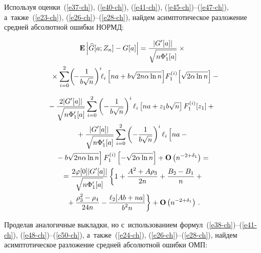 \begin{multicols}{2}
 Используя оценки~(\ref{e37-ch}), (\ref{e40-ch}), (\ref{e41-ch}), 
 (\ref{e45-ch})--(\ref{e47-ch}), а~также~(\ref{e23-ch}), (\ref{e26-ch})--(\ref{e28-ch}),
 найдем асимптотическое разложение средней абсолютной ошибки НОРМД:
 
 \noindent
 \begin{multline*}
 \mathbf{E}\left|\widehat{G}[a;Z_n]-G[a]\right|=\fr{|G'[a]|}
 {\sqrt {n\Phi'_1[a]}}\times{}\\
 {}\times \sum\limits_{i=0}^2\!  
 \left(\!-\fr{1}{b\sqrt{n}}\right)^i\!\! 
 \ell_i\left[na+b\sqrt{2n\alpha\ln n}\right]\! F_1^{(i)}\!\left[\sqrt{2\alpha\ln n}\right]-{}\hspace*{-6.48pt}
 \end{multline*}
 
 \noindent
 \begin{multline}
 \hspace*{-4.159pt}{} -\fr{2|G'[a]|}{\sqrt {n\Phi'_1[a]}}\sum\limits_{i=0}^2 
\left(-\fr{1}{b\sqrt{n}}\right)^i
 \ell_i\left[na+z_{1} b\sqrt{n}\right] F_1^{(i)}[z_{1}]+{}
\\
 {}+\fr{\left\vert G'[a]\right\vert }{\sqrt {n\Phi'_1[a]}}\sum\limits_{i=0}^2  
 \left(-\fr{1}{b\sqrt{n}}\right)^i
 \ell_i\left[
 \vphantom{\sqrt{2n\alpha\ln n}}
 na-{}\right.\\
\left. {}-b\sqrt{2n\alpha\ln n}\right] F_1^{(i)}\left[-\sqrt{2\alpha\ln n}\right]
 +\mathbf{O}\left(n^{-2+\delta_1}\right)={}
\\
 {}=\fr{2\varphi[0]|G'[a]|}{\sqrt{n\Phi'_1[a]}}
 \left\{1+\fr{A^2+A\rho_3}{2n} +\fr{B_2-B_1}{n}+{}\right.\\
\left. {}+\fr{\rho_3^2-\rho_4}{24n}
 -\fr{\ell_2[Ab+na]}{b^2 n}
 \right\}+\mathbf{O}\left(n^{-2+\delta_1}\right)\,.
  \label{e51-ch}
 \end{multline}

 Проделав аналогичные выкладки, но с~использованием формул~(\ref{e38-ch})--(\ref{e41-ch}), 
 (\ref{e48-ch})--(\ref{e50-ch}), а~также~(\ref{e24-ch}), (\ref{e26-ch})--(\ref{e28-ch}),
 найдем асимптотическое разложение средней абсолютной ошибки ОМП:
 

\end{multicols}
